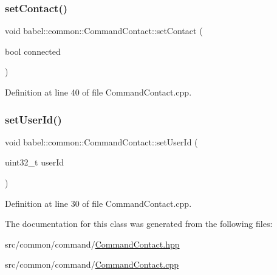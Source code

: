 \subsubsection{\texorpdfstring{set\+Contact()}{setContact()}}
{\footnotesize\ttfamily void babel\+::common\+::\+Command\+Contact\+::set\+Contact (\begin{DoxyParamCaption}\item[{bool}]{connected }\end{DoxyParamCaption})}



Definition at line 40 of file Command\+Contact.\+cpp.

\mbox{\label{classbabel_1_1common_1_1_command_contact_ab3ee4ea19427d59a9a601523131a7dc4}} 
\subsubsection{\texorpdfstring{set\+User\+Id()}{setUserId()}}
{\footnotesize\ttfamily void babel\+::common\+::\+Command\+Contact\+::set\+User\+Id (\begin{DoxyParamCaption}\item[{uint32\+\_\+t}]{user\+Id }\end{DoxyParamCaption})}



Definition at line 30 of file Command\+Contact.\+cpp.



The documentation for this class was generated from the following files\+:\begin{DoxyCompactItemize}
\item 
src/common/command/\mbox{\hyperlink{_command_contact_8hpp}{Command\+Contact.\+hpp}}\item 
src/common/command/\mbox{\hyperlink{_command_contact_8cpp}{Command\+Contact.\+cpp}}\end{DoxyCompactItemize}

